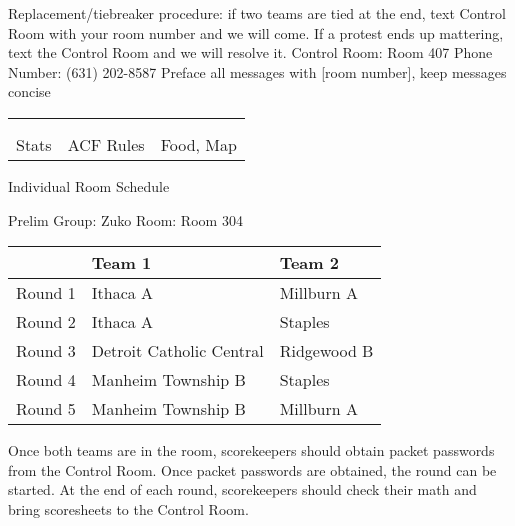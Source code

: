 \documentclass{article}%
\begin{document}
\newline%
Replacement/tiebreaker procedure: if two teams are tied at the end, text Control Room with your room number and we will come. If a protest ends up mattering, text the Control Room and we will resolve it.\newline%
\newline%
Control Room: Room 407\newline%
Phone Number: (631) 202{-}8587\newline%
Preface all messages with {[}room number{]}, keep messages concise%
\vspace*{30pt}%
\newline%
%
\begin{tabularx}{\textwidth}{YYY}%
  &  &  \\%
\\%
Stats&ACF Rules&Food, Map\\%
\end{tabularx}%
\newpage%
\begin{center}%
\begin{Huge}%
Individual Room Schedule%
\end{Huge}%
\vspace*{16pt}%
\linebreak%
\begin{Large}%
Prelim Group: Zuko \hfill Room: Room 304%
\end{Large}%
\end{center}%
%
\begin{tabularx}{\textwidth}{|c|Y|Y|}%
\hline%
&Team 1&Team 2\\%
\hline%
Round 1&Ithaca A&Millburn A\\%
Round 2&Ithaca A&Staples\\%
Round 3&Detroit Catholic Central&Ridgewood B\\%
Round 4&Manheim Township B&Staples\\%
Round 5&Manheim Township B&Millburn A\\%
\hline%
\end{tabularx}%
\vspace*{16pt}%
\linebreak%
Once both teams are in the room, scorekeepers should obtain packet passwords from the Control Room. Once packet passwords are obtained, the round can be started. At the end of each round, scorekeepers should check their math and bring scoresheets to the Control Room.\newline%
\end{document}
